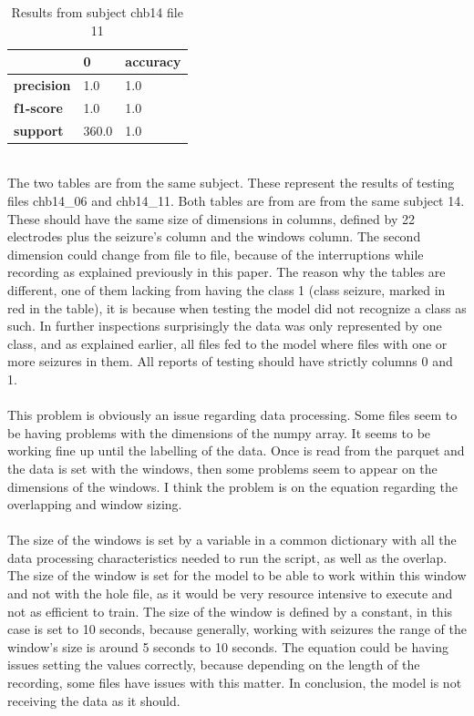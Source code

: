 \begin{table}[H]
    \centering
    \caption{Results from subject chb14 file 11}
    \begin{tabular}{|l|l|l|}
        \hline
                        & \textbf{0} & \textbf{accuracy} \\ \hline
        \textbf{precision} & 1.0        & 1.0               \\ \hline
        \textbf{f1-score}  & 1.0        & 1.0               \\ \hline
        \textbf{support}   & 360.0      & 1.0               \\ \hline
    \end{tabular}
\end{table}
\leavevmode\\
The two tables are from the same subject. These represent the results of testing files chb14\_06 and chb14\_11. Both tables are from are from the same subject 14. These should have the same size of dimensions in columns, defined by 22 electrodes plus the seizure’s column and the windows column. The second dimension could change from file to file, because of the interruptions while recording as explained previously in this paper. The reason why the tables are different, one of them lacking from having the class 1 (class seizure, marked in red in the table), it is because when testing the model did not recognize a class as such. In further inspections surprisingly the data was only represented by one class, and as explained earlier, all files fed to the model where files with one or more seizures in them. All reports of testing should have strictly columns 0 and 1.
\\\\
This problem is obviously an issue regarding data processing. Some files seem to be having problems with the dimensions of the numpy array. It seems to be working fine up until the labelling of the data. Once is read from the parquet and the data is set with the windows, then some problems seem to appear on the dimensions of the windows. I think the problem is on the equation regarding the overlapping and window sizing.
\\\\
The size of the windows is set by a variable in a common dictionary with all the data processing characteristics needed to run the script, as well as the overlap. The size of the window is set for the model to be able to work within this window and not with the hole file, as it would be very resource intensive to execute and not as efficient to train. The size of the window is defined by a constant, in this case is set to 10 seconds, because generally, working with seizures the range of the window’s size is around 5 seconds to 10 seconds. The equation could be having issues setting the values correctly, because depending on the length of the recording, some files have issues with this matter. In conclusion, the model is not receiving the data as it should.
\leavevmode\\


